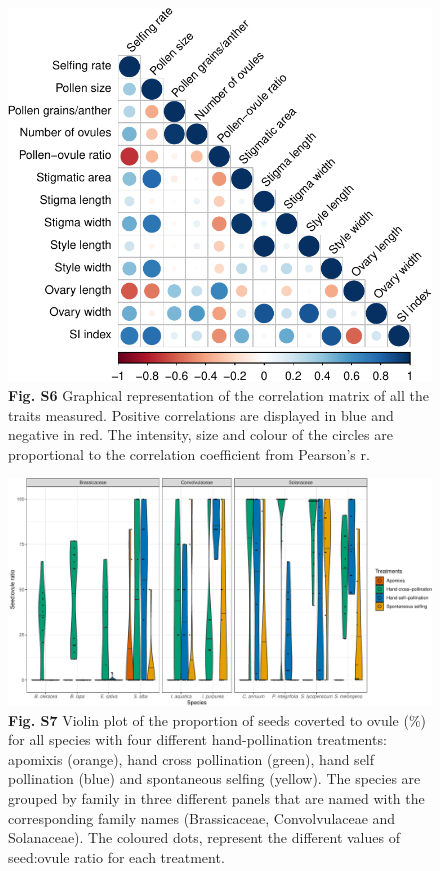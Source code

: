 \documentclass[
  12pt,
]{article}
\begin{document}
\begin{figure}
\centering
\includegraphics{Supp_Material_files/figure-latex/unnamed-chunk-15-1.pdf}
\caption{\textbf{Fig. S6} Graphical representation of the correlation
matrix of all the traits measured. Positive correlations are displayed
in blue and negative in red. The intensity, size and colour of the
circles are proportional to the correlation coefficient from Pearson's
r.}
\end{figure}

\clearpage

\begin{figure}
\centering
\includegraphics{Supp_Material_files/figure-latex/unnamed-chunk-16-1.pdf}
\caption{\textbf{Fig. S7} Violin plot of the proportion of seeds
coverted to ovule (\%) for all species with four different
hand-pollination treatments: apomixis (orange), hand cross pollination
(green), hand self pollination (blue) and spontaneous selfing (yellow).
The species are grouped by family in three different panels that are
named with the corresponding family names (Brassicaceae, Convolvulaceae
and Solanaceae). The coloured dots, represent the different values of
seed:ovule ratio for each treatment.}
\end{figure}
\end{document}
